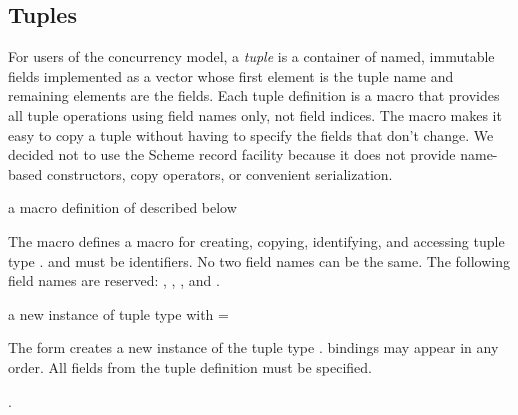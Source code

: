 \subsection {Tuples}

For users of the concurrency model, a \emph{tuple} is a
container of named, immutable fields implemented as a vector whose
first element is the tuple name and remaining elements are the
fields. Each tuple definition is a macro that provides all tuple
operations using field names only, not field indices. The macro makes
it easy to copy a tuple without having to specify the fields that
don't change.  We decided not to use the Scheme record facility
because it does not provide name-based constructors, copy operators,
or convenient serialization.

\begin{syntax}
\end{syntax}
\expandsto{} a macro definition of  described below

The  macro defines a macro for creating,
copying, identifying, and accessing tuple type . 
and  \etc{} must be identifiers. No two field names can be
the same. The following field names are reserved: ,
, , and .

\begin{syntax}
\end{syntax}
\returns{} a new instance of tuple type  with  =
 \etc{}

The  form creates a new instance of the tuple type
.  bindings may appear in any order. All fields
from the tuple definition must be specified.

\begin{syntax}
\end{syntax}
\returns{} .

